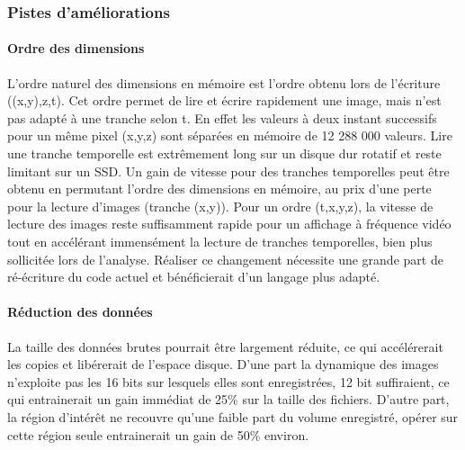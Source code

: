 

\subsubsection{Pistes d'améliorations}

\paragraph{Ordre des dimensions}
L'ordre naturel des dimensions en mémoire est l'ordre obtenu lors de l'écriture ((x,y),z,t). Cet ordre permet de lire et écrire rapidement une image, mais n'est pas adapté à une tranche selon t. En effet les valeurs à deux instant successifs pour un même pixel (x,y,z) sont séparées en mémoire de 12 288 000 valeurs. Lire une tranche temporelle est extrêmement long sur un disque dur rotatif et reste limitant sur un SSD. Un gain de vitesse pour des tranches temporelles peut être obtenu en permutant l'ordre des dimensions en mémoire, au prix d'une perte pour la lecture d'images (tranche (x,y)). Pour un ordre (t,x,y,z), la vitesse de lecture des images reste suffisamment rapide pour un affichage à fréquence vidéo tout en accélérant immensément la lecture de tranches temporelles, bien plus sollicitée lors de l'analyse. Réaliser ce changement nécessite une grande part de ré-écriture du code actuel et bénéficierait d'un langage plus adapté.


\paragraph{Réduction des données}
La taille des données brutes pourrait être largement réduite, ce qui accélérerait les copies et libérerait de l'espace disque. D'une part la dynamique des images n'exploite pas les 16 bits sur lesquels elles sont enregistrées, 12 bit suffiraient, ce qui entrainerait un gain immédiat de 25\% sur la taille des fichiers. D'autre part, la région d'intérêt ne recouvre qu'une faible part du volume enregistré, opérer sur cette région seule entrainerait un gain de 50\% environ.

